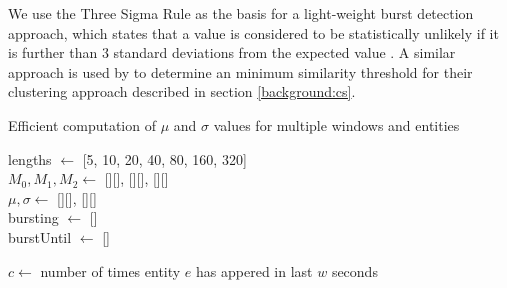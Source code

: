 We use the Three Sigma Rule as the basis for a light-weight burst detection approach, which states that a value is considered to be statistically unlikely if it is further than 3 standard deviations from the expected value \citep{Pukelsheim94}.
A similar approach is used by \cite{Aggarwal12} to determine an minimum similarity threshold for their clustering approach described in section \ref{background:cs}.

\begin{algorithm}[t]
	\caption{Efficient computation of $\mu$ and $\sigma$ values for multiple windows and entities}
	\label{detection:alg:updatingEntityValues}

	\DontPrintSemicolon

	lengths $\gets$ [5, 10, 20, 40, 80, 160, 320]\\
	$M_0, M_1, M_2 \gets$ [][], [][], [][] \\
	$\mu, \sigma \gets$ [][], [][] \\
	bursting $\gets$ [] \\
	burstUntil $\gets$ [] \\

	 {

		 {


			 {
				$c \gets$ number of times entity $e$ has appered in last $w$ seconds \\

			}

		}
	}
\end{algorithm}

